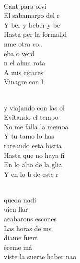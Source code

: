 \begin{cancion}[Sixtinain][Guitarricadelafuente]%
\jump
	     \chord{(}{**)}{    }\\
	Cant para olvi\\
	El sabamargo del r\\
	Y ber y beber y be\\
	Hasta per la formalid\\
\jump
	nme otra co..\\
	eba o verd\\
	n el alma rota\\
	A mis cicaces\\
	Vinagre con l \\\jump\\
	\begin{chorus}%
	y viajando con las ol\\
	Evitando el tempo\\
	No me falla la memoa\\
	Y tu tamo lo has \\
\jump
	rareando esta hisria\\
	Hasta que no haya fi\\
	En lo alto de la glia\\
	Y en lo b de este r \\
	\end{chorus}%
	\jump\\
	 queda nadi\\
	uien llar\\
	 acabarons escones\\
	Las horas de ms\\
\jump
	diame fuert\\
	éreme má\\
	viste la suerte haber nao\\

\end{cancion}
